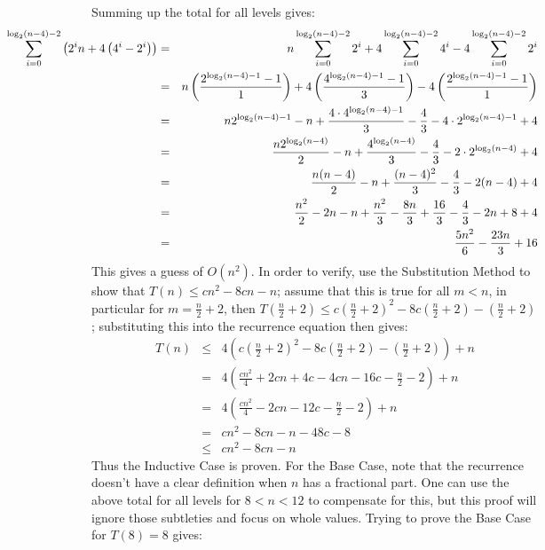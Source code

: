 Summing up the total for all levels gives:
\begin{eqnarray*}
	\hspace*{-1in} %
	\sum_{i=0}^{\log_2(n-4)-2} \left ( 2^i n + 4 \left ( 4^i - 2^i \right ) \right ) & = & n \sum_{i=0}^{\log_2(n-4)-2} 2^i + 4 \sum_{i=0}^{\log_2(n-4)-2} 4^i - 4 \sum_{i=0}^{\log_2(n-4)-2} 2^i \\
	& = & n \left ( \frac{2^{\log_2(n-4)-1} - 1}{1} \right ) + 4 \left ( \frac{4^{\log_2(n-4)-1} - 1}{3} \right ) - 4 \left ( \frac{2^{\log_2(n-4)-1} - 1}{1} \right ) \\
	& = & n 2^{\log_2(n-4)-1} - n + \frac{4 \cdot 4^{\log_2(n-4)-1}}{3} - \frac{4}{3} - 4 \cdot 2^{\log_2(n-4)-1} + 4 \\
	& = & \frac{n 2^{\log_2(n-4)}}{2} - n + \frac{4^{\log_2(n-4)}}{3} - \frac{4}{3} - 2 \cdot 2^{\log_2(n-4)} + 4 \\
	& = & \frac{n(n-4)}{2} - n + \frac{(n-4)^2}{3} - \frac{4}{3} - 2(n-4) + 4 \\
	& = & \frac{n^2}{2} - 2n - n + \frac{n^2}{3} - \frac{8n}{3} + \frac{16}{3} - \frac{4}{3} - 2n + 8 + 4 \\
	& = & \frac{5n^2}{6} - \frac{23n}{3} + 16
\end{eqnarray*}
This gives a guess of $O(n^2)$.  In order to verify, use the Substitution Method to show that $T(n) \leq cn^2 - 8cn -n$; assume that this is true for all $m < n$, in particular for $m = \frac{n}{2} + 2$, then $T(\frac{n}{2} + 2) \leq c(\frac{n}{2} + 2)^2 - 8c(\frac{n}{2} + 2) - (\frac{n}{2} + 2)$; substituting this into the recurrence equation then gives:
\begin{eqnarray*}
	T(n) & \leq & 4 \left ( c \left ( \frac{n}{2} + 2 \right )^2 - 8c \left ( \frac{n}{2} + 2 \right ) - \left ( \frac{n}{2} + 2 \right ) \right ) + n \\
	& = & 4 \left ( \frac{cn^2}{4} + 2cn + 4c - 4cn - 16c - \frac{n}{2} - 2 \right ) + n \\
	& = & 4 \left ( \frac{cn^2}{4} - 2cn - 12c - \frac{n}{2} - 2 \right ) + n \\
	& = & cn^2 - 8cn - n - 48c - 8 \\
	& \leq & cn^2 - 8cn - n
\end{eqnarray*}
Thus the Inductive Case is proven.  For the Base Case, note that the recurrence doesn't have a clear definition when $n$ has a fractional part.  One can use the above total for all levels for $8 < n < 12$ to compensate for this, but this proof will ignore those subtleties and focus on whole values.  Trying to prove the Base Case for $T(8) = 8$ gives:
